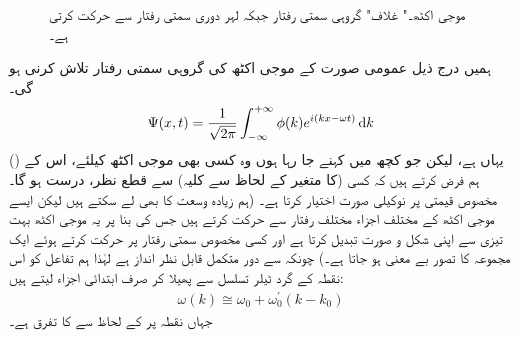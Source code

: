 \begin{figure}
\centering
{}
\caption{موجی اکٹھ۔" غلاف" گروہی سمتی رفتار جبکہ لہر دوری سمتی رفتار سے حرکت کرتی ہے۔}
\label{شکل_غیر_تابع_موجی_اکٹھ_رفتاریں}
\end{figure}
 ہمیں درج ذیل عمومی صورت کے موجی اکٹھ کی گروہی سمتی رفتار تلاش کرنی ہو گی۔ 
\begin{align*}
\Psi (x,t) = \frac{1}{\sqrt{2\pi}} \int_{- \infty}^{+ \infty} \phi (k) e^{i(kx - \omega t)} \dif k
\end{align*}
 (یہاں  ہے، لیکن جو کچھ میں کہنے جا رہا ہوں وہ کسی بھی موجی اکٹھ کیلئے، اس کے  ( کا متغیر  کے لحاظ سے کلیہ) سے قطع نظر، درست ہو گا۔) ہم فرض کرتے ہیں کہ کسی مخصوص قیمتی  پر  نوکیلی صورت اختیار کرتا ہے۔ (ہم زیادہ وسعت کا  بھی لے سکتے ہیں لیکن ایسے موجی اکٹھ کے مختلف اجزاء مختلف رفتار سے حرکت کرتے ہیں جس کی بنا پر یہ موجی اکٹھ بہت تیزی سے اپنی شکل و صورت تبدیل کرتا ہے اور کسی مخصوص سمتی رفتار پر حرکت کرتے ہوئے ایک مجموعہ کا تصور بے معنی ہو جاتا ہے۔) چونکہ  سے دور متکمل قابل نظر انداز ہے لہٰذا ہم تفاعل  کو اس نقطہ کے گرد ٹیلر تسلسل سے پھیلا کر صرف ابتدائی اجزاء لیتے ہیں:
\begin{align*}
\omega (k) \cong \omega_{0} + \omega_{0}^{'} (k-k_{0})
\end{align*}
 جہاں نقطہ  پر  کے لحاظ سے  کا تفرق  ہے۔
 

